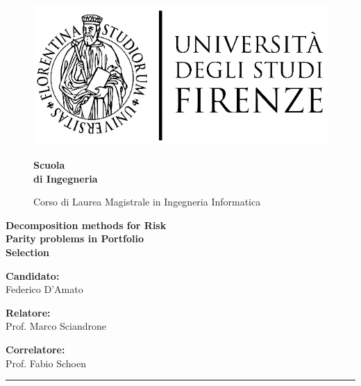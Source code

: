 \begin{figure}[htbp]
\begin{minipage}{0.3\textwidth}
\centering
\includegraphics[scale=0.8]{logo_universita.eps}
\end{minipage}
\hspace{0.3\textwidth}
\begin{minipage}{0.4\textwidth}
\centering
\begin{flushright}
{\Large \textbf{Scuola\\
 di Ingegneria \\}
}
\end{flushright}
\begin{flushright}
Corso di Laurea Magistrale in Ingegneria Informatica
\end{flushright}
\end{minipage}

\end{figure}


\vspace{35mm}
\begin{center}

 {\huge {\bf Decomposition methods for Risk}}\\
 \vspace{2mm}
 {\huge{\bf Parity problems in Portfolio}}\\
 \vspace{2mm}
 {\huge{\bf Selection}}\\

\end{center}
\vspace{45mm}

\noindent
{\Large \textbf{Candidato:}}\\
\noindent
{\LARGE Federico D'Amato\\}

\begin{minipage}{0.5\textwidth}
{\Large \textbf{Relatore:}\\}
{\LARGE Prof. Marco Sciandrone
}
\end{minipage}
\begin{minipage}{0.5\textwidth}
\begin{flushright}
{\Large \textbf{Correlatore:}\\}
{\LARGE Prof. Fabio Schoen}
\end{flushright}
\end{minipage}
\vfill
\begin{center}
\rule{0.7\textwidth}{.4pt}
\end{center}
\vspace{-5mm}
